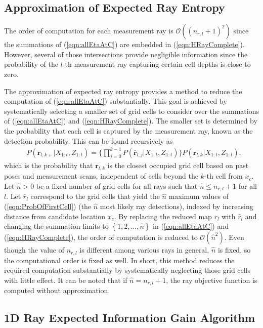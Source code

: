 \documentclass[smallextended]{svjour3}       %
\newcommand{\braces}[1]{\ensuremath{\left\{ #1 \right\}}}
\newcommand{\refeqn}[1]{(\ref{eqn:#1})}
\begin{document}
\subsection{Approximation of Expected Ray Entropy}

The order of computation for each measurement ray is $\mathcal O((n_{r,l}+1)^2)$ since the summations of \refeqn{allEtaAtC} are embedded in \refeqn{HRayComplete}. However, several of those intersections provide negligible information since the probability of the $l$-th measurement ray capturing certain cell depths is close to zero.

The approximation of expected ray entropy provides a method to reduce the computation of \refeqn{allEtaAtC} substantially. This goal is achieved by systematically selecting a smaller set of grid cells to consider over the summations of \refeqn{allEtaAtC} and \refeqn{HRayComplete}.
The smaller set is determined by the probability that each cell is captured by the measurement ray, known as the detection probability. This can be found recursively as
\begin{align}
\label{eqn:ProbOfFirstCell}
&P(\mathbf{r}_{l,k+}|X_{1:t},Z_{1:t})%
=\bigg\{\prod_{j=0}^{k-1}P(\bar{\mathbf{r}}_{l,j}|X_{1:t},Z_{1:t})\bigg\}P(\mathbf{r}_{l,k}|X_{1:t},Z_{1:t}),
\end{align}
which is the probability that $\mathbf{r}_{l,k}$ is the closest occupied grid cell based on past poses and measurement scans, independent of cells beyond the $k$-th cell from $x_c$.
Let $\hat n>0$ be a fixed number of grid cells for all rays such that $\hat n\leq n_{r,l}+1$ for all $l$.
Let $\hat{r}_{l}$ correspond to the grid cells that yield the $\hat{n}$ maximum values of \refeqn{ProbOfFirstCell} (the $\hat n$ most likely ray detections), indexed by increasing distance from candidate location $x_c$.
By replacing the reduced map $r_l$ with $\hat{r}_l$ and changing the summation limits to $\braces{1,2,...,\hat n}$ in \refeqn{allEtaAtC} and \refeqn{HRayComplete}, the order of computation is reduced to $\mathcal O({\hat{n}}^2)$.
Even though the value of $n_{r,l}$ is different among various rays in general, $\hat n$ is fixed, so the computational order is fixed as well.
In short, this method reduces the required computation substantially by systematically neglecting those grid cells with little effect. It can be noted that if $\hat n=n_{r,l}+1$, the ray objective function is computed without approximation.


\subsection{1D Ray Expected Information Gain Algorithm}
\end{document}
